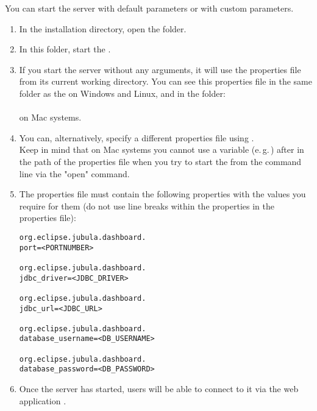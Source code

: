 You can start the \dash{} server with default parameters or with custom parameters. 

\begin{enumerate}
\item In the installation directory, open the  folder. 
\item In this folder, start the . 
\item If you start the server without any arguments, it will use the properties file  from its current working directory. You can see this properties file in the same folder as the  on Windows and Linux, and in the folder:\\
\\
on Mac systems. 
\item You can, alternatively, specify a different properties file using .\\
Keep in mind that on Mac systems you cannot use a variable (e.\,g.\,) after  in the path of the properties file when you try to start the  from the command line via the "open" command.
\item The properties file must contain the following properties with the values you require for them (do not use line breaks within the properties in the properties file):
\begin{verbatim}
org.eclipse.jubula.dashboard.
port=<PORTNUMBER>

org.eclipse.jubula.dashboard.
jdbc_driver=<JDBC_DRIVER>

org.eclipse.jubula.dashboard.
jdbc_url=<JDBC_URL>

org.eclipse.jubula.dashboard.
database_username=<DB_USERNAME>

org.eclipse.jubula.dashboard.
database_password=<DB_PASSWORD>
\end{verbatim}
\item Once the \dash{} server has started, users will be able to connect to it via the web application .
\end{enumerate}
